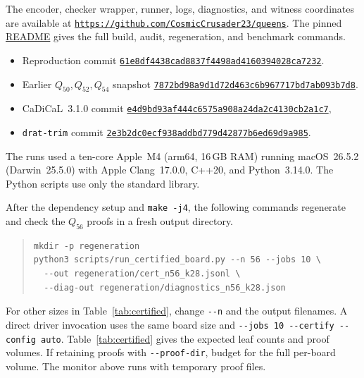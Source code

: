 \documentclass[11pt,a4paper]{article}
\theoremstyle{result}
\theoremstyle{definition}
\theoremstyle{remark}
\newcommand{\ReproCommit}{61e8df4438cad8837f4498ad4160394028ca7232}
\begin{document}
The encoder, checker wrapper, runner, logs, diagnostics, and
witness coordinates are available at
\href{https://github.com/CosmicCrusader23/queens}{\nolinkurl{https://github.com/CosmicCrusader23/queens}}.
The pinned
\href{https://github.com/CosmicCrusader23/queens/blob/\ReproCommit/README.md}{README}
gives the full build, audit, regeneration, and benchmark commands.

\begin{itemize}[leftmargin=1.8em,itemsep=2pt]
  \item Reproduction commit
    \href{https://github.com/CosmicCrusader23/queens/tree/\ReproCommit}{\nolinkurl{61e8df4438cad8837f4498ad4160394028ca7232}}.
  \item Earlier $Q_{50},Q_{52},Q_{54}$ snapshot
    \href{https://github.com/CosmicCrusader23/queens/tree/7872bd98a9d1d72d463c6b967717bd7ab093b7d8}{\nolinkurl{7872bd98a9d1d72d463c6b967717bd7ab093b7d8}}.
  \item CaDiCaL~3.1.0 commit
    \href{https://github.com/arminbiere/cadical/commit/e4d9bd93af444c6575a908a24da2c4130cb2a1c7}{\nolinkurl{e4d9bd93af444c6575a908a24da2c4130cb2a1c7}},
  \item \texttt{drat-trim} commit
    \href{https://github.com/marijnheule/drat-trim/commit/2e3b2dc0ecf938addbd779d42877b6ed69d9a985}{\nolinkurl{2e3b2dc0ecf938addbd779d42877b6ed69d9a985}}.
\end{itemize}
The runs used a ten-core Apple~M4 (arm64, 16\,GB RAM) running
macOS~26.5.2 (Darwin~25.5.0) with Apple Clang~17.0.0, C++20, and
Python~3.14.0. The Python scripts use only the standard library.

After the dependency setup and \texttt{make -j4}, the following
commands regenerate and check the $Q_{56}$ proofs in a fresh
output directory.
\begin{quote}\small
\begin{verbatim}
mkdir -p regeneration
python3 scripts/run_certified_board.py --n 56 --jobs 10 \
  --out regeneration/cert_n56_k28.jsonl \
  --diag-out regeneration/diagnostics_n56_k28.json
\end{verbatim}
\end{quote}
For other sizes in Table~\ref{tab:certified}, change \texttt{-{}-n}
and the output filenames. A direct driver invocation uses the
same board size and \texttt{-{}-jobs 10 -{}-certify -{}-config auto}.
Table~\ref{tab:certified} gives the expected leaf counts and proof
volumes. If retaining proofs with \texttt{-{}-proof-dir}, budget
for the full per-board volume. The monitor above runs with
temporary proof files.
\end{document}
